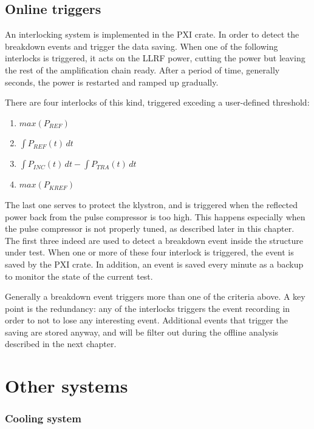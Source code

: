 \subsection[Online triggers]{Online triggers}
 \label{subs:itlk}

An interlocking system is implemented in the PXI crate. In order to detect the breakdown events and trigger the data saving. When one of the following interlocks is triggered, it acts on the LLRF power, cutting the power but leaving the rest of the amplification chain ready. After a period of time, generally seconds, the power is restarted and ramped up gradually.

There are four interlocks of this kind, triggered exceding a user-defined threshold:
\begin{enumerate}
\item { $max(P_{REF})$}
\item { $\int P_{REF}(t) \, dt $}
\item { $\int P_{INC}(t)\,dt - \int P_{TRA}(t)\,dt$}
\item { $max(P_{KREF})$}
\end{enumerate}
The last one serves to protect the klystron, and is triggered when the reflected power back from the pulse compressor is too high. This happens especially when the pulse compressor is not properly tuned, as described later in this chapter.
The first three indeed are used to detect a breakdown event inside the structure under test. When one or more of these four interlock is triggered, the event is saved by the PXI crate. In addition, an event is saved every minute as a backup to monitor the state of the current test.

Generally a breakdown event triggers more than one of the criteria above. A key point is the redundancy: any of the interlocks triggers the event recording in order to not to lose any interesting event. Additional events that trigger the saving are stored anyway, and will be filter out during the offline analysis described in the next chapter.


\section[Other systems]{Other systems}

\subsubsection{Cooling system}

